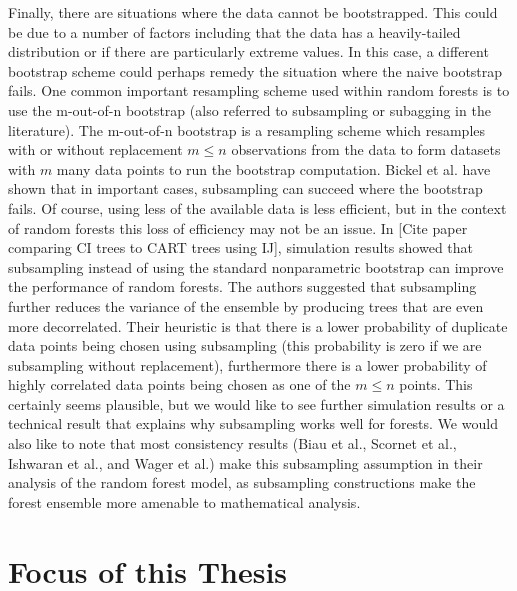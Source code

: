 \documentclass[12pt,twoside]{reedthesis}
\theoremstyle{definition}
\theoremstyle{definition}
\theoremstyle{definition}
\theoremstyle{remark}
\begin{document}
Finally, there are situations where the data cannot be bootstrapped.
This could be due to a number of factors including that the data has a
heavily-tailed distribution or if there are particularly extreme values.
In this case, a different bootstrap scheme could perhaps remedy the
situation where the naive bootstrap fails. One common important
resampling scheme used within random forests is to use the m-out-of-n
bootstrap (also referred to subsampling or subagging in the literature).
The m-out-of-n bootstrap is a resampling scheme which resamples with or
without replacement \(m\leq n\) observations from the data to form
datasets with \(m\) many data points to run the bootstrap computation.
Bickel et al. have shown that in important cases, subsampling can
succeed where the bootstrap fails. Of course, using less of the
available data is less efficient, but in the context of random forests
this loss of efficiency may not be an issue. In {[}Cite paper comparing
CI trees to CART trees using IJ{]}, simulation results showed that
subsampling instead of using the standard nonparametric bootstrap can
improve the performance of random forests. The authors suggested that
subsampling further reduces the variance of the ensemble by producing
trees that are even more decorrelated. Their heuristic is that there is
a lower probability of duplicate data points being chosen using
subsampling (this probability is zero if we are subsampling without
replacement), furthermore there is a lower probability of highly
correlated data points being chosen as one of the \(m\leq n\) points.
This certainly seems plausible, but we would like to see further
simulation results or a technical result that explains why subsampling
works well for forests. We would also like to note that most consistency
results (Biau et al., Scornet et al., Ishwaran et al., and Wager et al.)
make this subsampling assumption in their analysis of the random forest
model, as subsampling constructions make the forest ensemble more
amenable to mathematical analysis.

\section{Focus of this Thesis}\label{focus-of-this-thesis}
\end{document}

